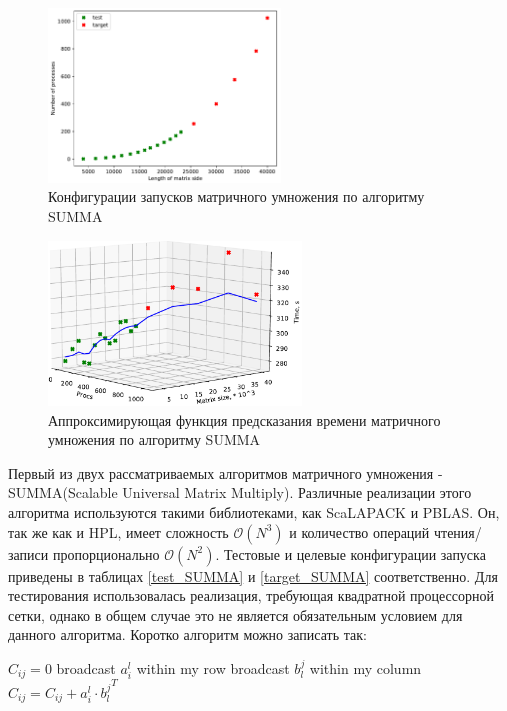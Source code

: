 			\begin{figure}
				\centering
				\includegraphics[width=0.55\textwidth]{./images/conf_SUMMA}
				\caption{Конфигурации запусков матричного умножения по алгоритму SUMMA}
				\label{conf_SUMMA}
			\end{figure}
			\begin{figure}
				\centering
				\includegraphics[width=0.6\textwidth]{./images/graph_SUMMA}
				\caption{Аппроксимирующая функция предсказания времени матричного умножения по алгоритму SUMMA}
				\label{graph_SUMMA}
			\end{figure}

			Первый из двух рассматриваемых алгоритмов матричного умножения - SUMMA(Scalable Universal Matrix Multiply)\cite{SUMMA}. Различные реализации этого алгоритма используются такими библиотеками, как ScaLAPACK и PBLAS. Он, так же как и HPL, имеет сложность \(\mathcal{O}(N^3)\) и количество операций чтения/записи пропорционально \(\mathcal{O}(N^2)\). Тестовые и целевые конфигурации запуска приведены в таблицах \eqref{test_SUMMA} и \eqref{target_SUMMA} соответственно. Для тестирования использовалась реализация, требующая квадратной процессорной сетки, однако в общем случае это не является обязательным условием для данного алгоритма. Коротко алгоритм можно записать так:
			\begin{algorithm}
				\begin{algorithmic}
					\State $C_{ij} = 0$
					\State broadcast $a_i^l$ within my row
					\State broadcast $b_l^j$ within my column
					\State $C_{ij} = C_{ij} + a_i^l \cdot {b_l^j}^T$
					\EndFor
				\label{SUMMA_algo}
				\end{algorithmic}
			\end{algorithm}
			
